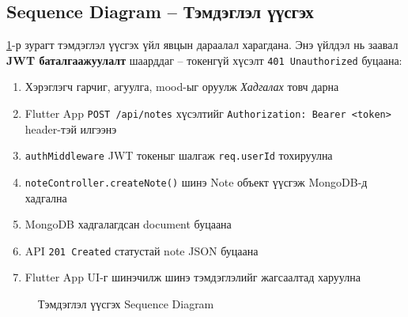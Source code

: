 \subsection{Sequence Diagram -- Тэмдэглэл үүсгэх}

\ref{fig:seqcreate}-р зурагт тэмдэглэл үүсгэх үйл явцын дараалал харагдана.
Энэ үйлдэл нь заавал \textbf{JWT баталгаажуулалт} шаарддаг -- токенгүй хүсэлт
\texttt{401 Unauthorized} буцаана:

\begin{enumerate}
  \item Хэрэглэгч гарчиг, агуулга, mood-ыг оруулж \textit{Хадгалах} товч дарна
  \item Flutter App \texttt{POST /api/notes} хүсэлтийг \texttt{Authorization: Bearer <token>} header-тэй илгээнэ
  \item \texttt{authMiddleware} JWT токеныг шалгаж \texttt{req.userId} тохируулна
  \item \texttt{noteController.createNote()} шинэ Note объект үүсгэж MongoDB-д хадгална
  \item MongoDB хадгалагдсан document буцаана
  \item API \texttt{201 Created} статустай note JSON буцаана
  \item Flutter App UI-г шинэчилж шинэ тэмдэглэлийг жагсаалтад харуулна
\end{enumerate}

\begin{figure}[ht]
\centering
{}
\caption{Тэмдэглэл үүсгэх Sequence Diagram}
\label{fig:seqcreate}
\end{figure}

